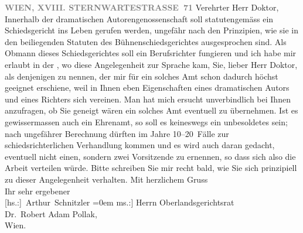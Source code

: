 \begin{ledgroupsized}[t]{13cm}
           \textcolor{gray}{\textbf{WIEN, XVIII. STERNWARTESTRASSE 71}}\pend
           \pstart{}Verehrter Herr Doktor,\pend\pstart
           Innerhalb der dramatischen Autorengenossenschaft
               soll  statutengemäss ein Schiedsgericht ins Leben
               gerufen werden, ungefähr nach den Prinzipien, wie sie in den beiliegenden Statuten
               des Bühnenschiedsgerichtes ausgesprochen sind. Als Obmann dieses Schiedsgerichtes
               soll ein Berufsrichter fungieren und ich habe mir erlaubt in der \label{K_L02356-1v}\label{K_L02356-1h}, wo diese Angelegenheit zur Sprache kam, Sie, lieber Herr Doktor, als
               denjenigen zu nennen, der mir für ein solches Amt schon dadurch höchst geeignet
               erschiene, weil in Ihnen eben Eigenschaften eines dramatischen Autors und eines
               Richters sich vereinen. Man hat mich ersucht unverbindlich bei Ihnen anzufragen, ob
               Sie geneigt wären ein solches Amt eventuell zu übernehmen. Ist es gewissermassen auch
               ein Ehrenamt, so soll es keineswegs ein unbesoldetes sein; nach ungefährer Berechnung
               dürften im Jahre 10–20 Fälle zur schiedsrichterlichen Verhandlung kommen und es wird
               auch daran gedacht, eventuell nicht einen, sondern zwei Vorsitzende zu ernennen, so
               dass sich also die Arbeit verteilen würde. Bitte schreiben Sie mir recht bald, wie
               Sie sich prinzipiell zu dieser Angelegenheit verhalten.\pend
           \pstart
           Mit herzlichem Gruss{\\[\baselineskip]}Ihr sehr ergebener{\\[\baselineskip]}\spacefill\mbox{{[}hs.:{]} Arthur Schnitzler}\pend
           \leftskip=0em{}\pstart
           \noindent{}{[}ms.:{]} Herrn Oberlandsgerichtsrat{\\}Dr. Robert Adam Pollak,{\\}Wien.\pend
           
         
         \endnumbering{}\end{ledgroupsized}  \newcommand{\dateiname}{L02356}\newcommand{\titel}{Arthur Schnitzler an Robert Adam, 28. 10. 1920}\newcommand{\editorInnen}{Martin Anton Müller und Gerd-Hermann Susen}
      